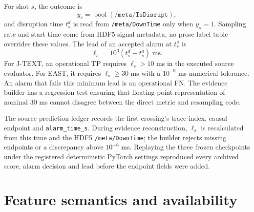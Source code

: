 \documentclass[10pt]{article}
\newcommand{\jtext}{J-TEXT}
\newcommand{\east}{EAST}
\newcommand{\code}[1]{\nolinkurl{#1}}
\begin{document}
For shot $s$, the outcome is
\begin{equation}
y_s=\operatorname{bool}(\texttt{/meta/IsDisrupt}),
\end{equation}
and disruption time $t_s^d$ is read from \code{/meta/DownTime} only when $y_s=1$.  Sampling rate and start time come from HDF5 signal metadata; no prose label table overrides these values.  The lead of an accepted alarm at $t_s^a$ is
\begin{equation}
\ell_s=10^3(t_s^d-t_s^a)\;\mathrm{ms}.
\end{equation}
For \jtext{}, an operational TP requires $\ell_s>10$ ms in the executed source evaluator.  For \east{}, it requires $\ell_s\geq30$ ms with a $10^{-9}$-ms numerical tolerance.  An alarm that fails this minimum lead is an operational FN.  The evidence builder has a regression test ensuring that floating-point representation of nominal 30 ms cannot disagree between the direct metric and resampling code.

The source prediction ledger records the first crossing's trace index, causal endpoint and \code{alarm\_time\_s}.  During evidence reconstruction, $\ell_s$ is recalculated from this time and the HDF5 \code{/meta/DownTime}; the builder rejects missing endpoints or a discrepancy above $10^{-6}$ ms.  Replaying the three frozen checkpoints under the registered deterministic PyTorch settings reproduced every archived score, alarm decision and lead before the endpoint fields were added.

\section{Feature semantics and availability}
\end{document}
